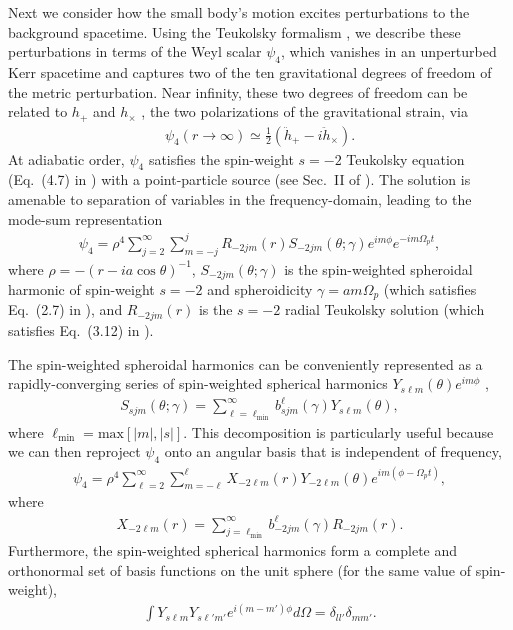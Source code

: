 \documentclass[%
 reprint,
 nofootinbib,
 amsmath,amssymb,
 aps,
 prd,
]{revtex4-2}
\begin{document}
Next we consider how the small body's motion excites perturbations to the background spacetime. Using the Teukolsky formalism \cite{Teuk73}, we describe these perturbations in terms of the Weyl scalar $\psi_4$, which vanishes in an unperturbed Kerr spacetime and captures two of the ten gravitational degrees of freedom of the metric perturbation. Near infinity, these two degrees of freedom can be related to $h_+$ and $h_\times$ \cite{DrasHugh06}, the two polarizations of the gravitational strain, via
\begin{align} \label{eqn:psi4ToH}
    \psi_4 (r\rightarrow \infty) \simeq \frac{1}{2}(\ddot{h}_+ - i \ddot{h}_\times).
\end{align}
At adiabatic order, $\psi_4$ satisfies the spin-weight $s=-2$ Teukolsky equation (Eq.~(4.7) in \cite{Teuk73}) with a point-particle source (see Sec.~II of \cite{SasaTago03}). The solution is amenable to separation of variables in the frequency-domain, leading to the mode-sum representation
\begin{align} \label{eqn:psi4Modes}
    \psi_4 = \rho^{4} \sum_{j=2}^\infty \sum_{m=-j}^j R_{-2jm}(r) S_{-2jm}(\theta;\gamma) e^{im\phi} e^{-im\Omega_pt},
\end{align}
where $\rho = -(r-ia\cos\theta)^{-1}$, $S_{-2jm}(\theta;\gamma)$ is the spin-weighted spheroidal harmonic of spin-weight $s=-2$ and spheroidicity $\gamma=a m\Omega_p$ (which satisfies Eq.~(2.7) in \cite{TeukPres74}), and $R_{-2jm}(r)$ is the $s=-2$ radial Teukolsky solution (which satisfies Eq.~(3.12) in \cite{DrasHugh06}).

The spin-weighted spheroidal harmonics can be conveniently represented as a rapidly-converging series of spin-weighted spherical harmonics $Y_{s\ell m}(\theta)e^{im\phi}$ \cite{Hugh00b},
\begin{align}
    S_{sjm}(\theta; \gamma) = \sum_{\ell=\ell_\mathrm{min}}^\infty b_{sjm}^\ell(\gamma) Y_{s\ell m}(\theta),
\end{align}
where $\ell_\mathrm{min}=\mathrm{max}[|m|,|s|]$. This decomposition is particularly useful because we can then reproject $\psi_4$ onto an angular basis that is independent of frequency,
\begin{align} \label{eqn:psi4LModes}
    \psi_4 = \rho^{4} \sum_{\ell=2}^\infty \sum_{m=-\ell}^\ell X_{-2\ell m}(r) Y_{-2\ell m}(\theta)e^{im(\phi - \Omega_pt)},
\end{align}
where
\begin{align} \label{eqn:XfromR}
    X_{-2\ell m}(r) = \sum_{j=\ell_\mathrm{min}}^\infty b_{-2jm}^\ell(\gamma)R_{-2jm}(r).
\end{align}
Furthermore, the spin-weighted spherical harmonics form a complete and orthonormal set of basis functions on the unit sphere (for the same value of spin-weight),
\begin{align}
    \int Y_{s\ell m} {Y}_{s\ell'm'} e^{i(m-m')\phi} d\Omega = \delta_{l l'} \delta_{m m'}.
\end{align}
\end{document}
